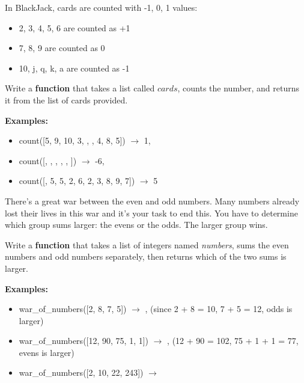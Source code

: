 



	\item 
		In BlackJack, cards are counted with -1, 0, 1 values:
		\begin{itemize}
			\item 2, 3, 4, 5, 6 are counted as +1
			\item 7, 8, 9 are counted as 0
			\item 10, j, q, k, a are counted as -1
		\end{itemize}
		Write a \textbf{function} that takes a list called $cards$, counts the number, 
		and returns it from the list of cards provided.

		\textbf{Examples:}		
		\begin{itemize}
			\item  count([5, 9, 10, 3, , , 4, 8, 5]) $\rightarrow$ 1, 
			\item  count([\csq{a}, , , \csq{q}, , ]) $\rightarrow$ -6, 
			\item  count([, 5, 5, 2, 6, 2, 3, 8, 9, 7]) $\rightarrow$ 5
		\end{itemize}



	\item 
		There's a great war between the even and odd numbers. Many numbers already lost 
		their lives in this war and it's your task to end this. You have to determine 
		which group sums larger: the evens or the odds. The larger group wins.

		Write a \textbf{function} that takes a list of integers named \textit{numbers}, 
		sums the even numbers and odd numbers separately, then returns which of the two
		sums is larger.

		\textbf{Examples:}		
		\begin{itemize}
			\item  war\_of\_numbers([2, 8, 7, 5]) $\rightarrow$ 
				, (since 2 + 8 = 10, 7 + 5 = 12, odds is larger) 
			\item  war\_of\_numbers([12, 90, 75, 1, 1]) $\rightarrow$ , 
				(12 + 90 = 102, 75 + 1 + 1 = 77, evens is larger) 
			\item  war\_of\_numbers([2, 10, 22, 243]) $\rightarrow$ 
		\end{itemize}



